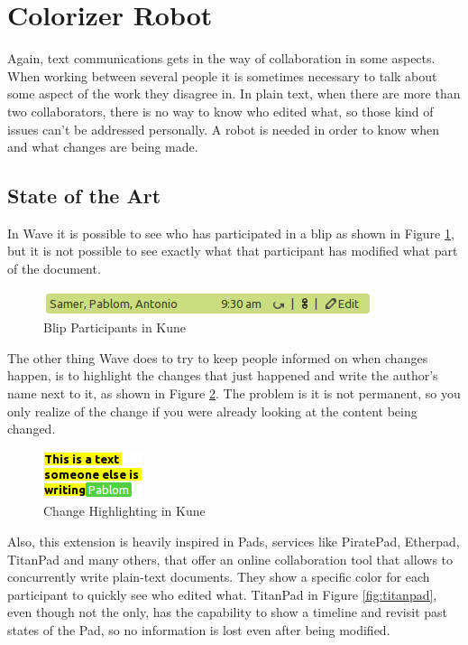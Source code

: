 \section{Colorizer Robot}
Again, text communications gets in the way of collaboration in some aspects. When working between several people it is sometimes necessary to talk about some aspect of the work they disagree in. In plain text, when there are more than two collaborators, there is no way to know who edited what, so those kind of issues can't be addressed personally. A robot is needed in order to know when and what changes are being made.

\label{subsec:color_soa}
\subsection{State of the Art}
In Wave it is possible to see who has participated in a blip as shown in Figure \ref{fig:participants}, but it is not possible to see exactly what that participant has modified what part of the document.
\begin{figure}[H]
  \center
    \includegraphics[keepaspectratio, scale=0.7]{Media/Captures/Wave/Participants.png}
  \caption{Blip Participants in Kune}
  \label{fig:participants}
\end{figure}
The other thing Wave does to try to keep people informed on when changes happen, is to highlight the changes that just happened and write the author's name next to it, as shown in Figure \ref{fig:participants2}. The problem is it is not permanent, so you only realize of the change if you were already looking at the content being changed.
\begin{figure}[H]
  \center
    \includegraphics[keepaspectratio, scale=0.7]{Media/Captures/Wave/Participants2.png}
  \caption{Change Highlighting in Kune}
  \label{fig:participants2}
\end{figure}
Also, this extension is heavily inspired in Pads, services like PiratePad, Etherpad, TitanPad and many others, that offer an online collaboration tool that allows to concurrently write plain-text documents. They show a specific color for each participant to quickly see who edited what. TitanPad in Figure \ref{fig:titanpad}, even though not the only, has the capability to show a timeline and revisit past states of the Pad, so no information is lost even after being modified.
